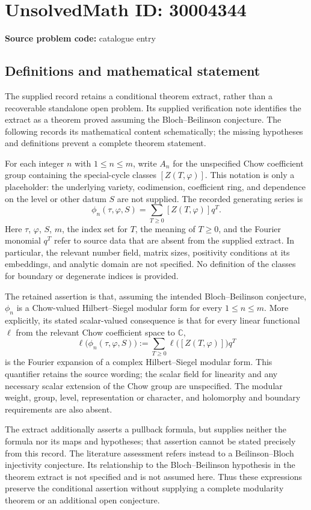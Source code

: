 \documentclass[11pt]{article}
\newcommand{\C}{\mathbb{C}}
\begin{document}
\section*{UnsolvedMath ID: 30004344}
\textbf{Source problem code:} catalogue entry
\subsection{Definitions and mathematical statement}
The supplied record retains a conditional theorem extract, rather than a recoverable standalone open problem. Its supplied verification note identifies the extract as a theorem proved assuming the Bloch--Beilinson conjecture. The following records its mathematical content schematically; the missing hypotheses and definitions prevent a complete theorem statement.

For each integer \(n\) with \(1\leq n\leq m\), write \(A_n\) for the unspecified Chow coefficient group containing the special-cycle classes \([Z(T,\varphi)]\). This notation is only a placeholder: the underlying variety, codimension, coefficient ring, and dependence on the level or other datum \(S\) are not supplied. The recorded generating series is
\[
\phi_n(\tau,\varphi,S)
 =\sum_{T\geq 0}[Z(T,\varphi)]q^T.
\]
Here \(\tau\), \(\varphi\), \(S\), \(m\), the index set for \(T\), the meaning of \(T\geq0\), and the Fourier monomial \(q^T\) refer to source data that are absent from the supplied extract. In particular, the relevant number field, matrix sizes, positivity conditions at its embeddings, and analytic domain are not specified. No definition of the classes for boundary or degenerate indices is provided.

The retained assertion is that, assuming the intended Bloch--Beilinson conjecture, \(\phi_n\) is a Chow-valued Hilbert--Siegel modular form for every \(1\leq n\leq m\). More explicitly, its stated scalar-valued consequence is that for every linear functional \(\ell\) from the relevant Chow coefficient space to \(\C\),
\[
\ell\bigl(\phi_n(\tau,\varphi,S)\bigr)
 :=\sum_{T\geq0}\ell\bigl([Z(T,\varphi)]\bigr)q^T
\]
is the Fourier expansion of a complex Hilbert--Siegel modular form. This quantifier retains the source wording; the scalar field for linearity and any necessary scalar extension of the Chow group are unspecified. The modular weight, group, level, representation or character, and holomorphy and boundary requirements are also absent.

The extract additionally asserts a pullback formula, but supplies neither the formula nor its maps and hypotheses; that assertion cannot be stated precisely from this record. The literature assessment refers instead to a Beilinson--Bloch injectivity conjecture. Its relationship to the Bloch--Beilinson hypothesis in the theorem extract is not specified and is not assumed here. Thus these expressions preserve the conditional assertion without supplying a complete modularity theorem or an additional open conjecture.
\end{document}
